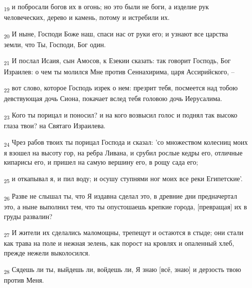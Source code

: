 \begin{tcolorbox}
\textsubscript{19} и побросали богов их в огонь; но это были не боги, а изделие рук человеческих, дерево и камень, потому и истребили их.
\end{tcolorbox}
\begin{tcolorbox}
\textsubscript{20} И ныне, Господи Боже наш, спаси нас от руки его; и узнают все царства земли, что Ты, Господи, Бог один.
\end{tcolorbox}
\begin{tcolorbox}
\textsubscript{21} И послал Исаия, сын Амосов, к Езекии сказать: так говорит Господь, Бог Израилев: о чем ты молился Мне против Сеннахирима, царя Ассирийского, --
\end{tcolorbox}
\begin{tcolorbox}
\textsubscript{22} вот слово, которое Господь изрек о нем: презрит тебя, посмеется над тобою девствующая дочь Сиона, покачает вслед тебя головою дочь Иерусалима.
\end{tcolorbox}
\begin{tcolorbox}
\textsubscript{23} Кого ты порицал и поносил? и на кого возвысил голос и поднял так высоко глаза твои? на Святаго Израилева.
\end{tcolorbox}
\begin{tcolorbox}
\textsubscript{24} Чрез рабов твоих ты порицал Господа и сказал: 'со множеством колесниц моих я взошел на высоту гор, на ребра Ливана, и срубил рослые кедры его, отличные кипарисы его, и пришел на самую вершину его, в рощу сада его;
\end{tcolorbox}
\begin{tcolorbox}
\textsubscript{25} и откапывал я, и пил воду; и осушу ступнями ног моих все реки Египетские'.
\end{tcolorbox}
\begin{tcolorbox}
\textsubscript{26} Разве не слышал ты, что Я издавна сделал это, в древние дни предначертал это, а ныне выполнил тем, что ты опустошаешь крепкие города, [превращая] их в груды развалин?
\end{tcolorbox}
\begin{tcolorbox}
\textsubscript{27} И жители их сделались маломощны, трепещут и остаются в стыде; они стали как трава на поле и нежная зелень, как порост на кровлях и опаленный хлеб, прежде нежели выколосился.
\end{tcolorbox}
\begin{tcolorbox}
\textsubscript{28} Сядешь ли ты, выйдешь ли, войдешь ли, Я знаю [всё, знаю] и дерзость твою против Меня.
\end{tcolorbox}

